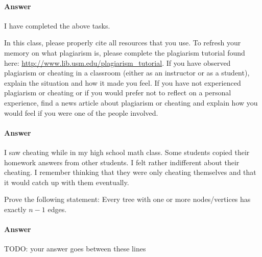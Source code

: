 \documentclass{article}
\begin{document}
\paragraph{Answer}


I have completed the above tasks.



\nextprob
\collab{}

    In this class,
    please properly cite all resources that you use.
    To refresh your memory on what plagiarism is,
    please
    complete the plagiarism tutorial found here:
    \url{http://www.lib.usm.edu/plagiarism_tutorial}.
    If you have observed plagiarism or cheating in a classroom (either as an
    instructor or as a student), explain the situation and how it made you
    feel.  If you have not experienced plagiarism or cheating or if you would
    prefer not to reflect on a personal experience, find a news
    article about plagiarism or cheating and explain how you would feel if you
    were one of the people involved.

\paragraph{Answer}


I saw cheating while in my high school math class.
Some students copied their homework answers from other students.
I felt rather indifferent about their cheating.
I remember thinking that they were only cheating themselves and that it would catch up with them eventually.




\nextprob
Prove the following statement: Every tree with one or more nodes/vertices has
exactly $n-1$ edges.

\paragraph{Answer}


TODO: your answer goes between these lines

\end{document}

